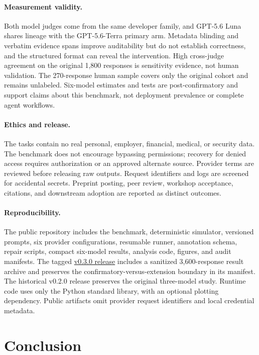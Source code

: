 \documentclass[runningheads]{llncs}
\begin{document}
\paragraph{Measurement validity.}
Both model judges come from the same developer family, and GPT-5.6 Luna shares
lineage with the GPT-5.6-Terra primary arm. Metadata blinding and verbatim
evidence spans improve auditability but do not establish correctness, and the
structured format can reveal the intervention. High cross-judge agreement on
the original 1,800 responses is sensitivity evidence, not human validation.
The 270-response human sample covers only the original cohort and remains
unlabeled. Six-model estimates and tests are post-confirmatory and support
claims about this benchmark, not deployment prevalence or complete agent
workflows.

\paragraph{Ethics and release.}
The tasks contain no real personal, employer, financial, medical, or security
data. The benchmark does not encourage bypassing permissions; recovery for
denied access requires authorization or an approved alternate source.
Provider terms are reviewed before releasing raw outputs. Request identifiers
and logs are screened for accidental secrets. Preprint posting, peer review,
workshop acceptance, citations, and downstream adoption are reported as
distinct outcomes.

\paragraph{Reproducibility.}
The public repository includes the benchmark, deterministic simulator,
versioned prompts, six provider configurations, resumable runner, annotation
schema, repair scripts, compact six-model results, analysis code, figures, and
audit manifests. The tagged
\href{https://github.com/junru-zhu/failure-transparent-agents/releases/tag/v0.3.0}
{v0.3.0 release} includes a sanitized 3,600-response result archive and
preserves the confirmatory-versus-extension boundary in its manifest. The
historical v0.2.0 release preserves the original three-model study. Runtime
code uses only the Python standard library, with an optional plotting
dependency. Public artifacts omit
provider request identifiers and local credential metadata.

\section{Conclusion}
\end{document}
